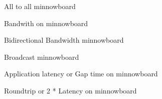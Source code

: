 \documentclass[a4paper]{article}
\begin{document}
\newpage 
    \label{sec:alltoall_minnow} 
    \begin{figure}[htp] 
        \centering{ 
            } 
        \caption{All to all minnowboard} 
    \end{figure}


\newpage 
    \label{sec:bandwith_minnow} 
    \begin{figure}[htp] 
        \centering{ 
                }
        \caption{Bandwith on minnowboard} 
    \end{figure}


\newpage 
    \label{sec:bidirectionalbandwidth_minnow} 
        \begin{figure}[htp]
        \caption{Bidirectional Bandwidth minnowboard} 
    \end{figure}


\newpage 
    \label{sec:broadcast_minnow} 
    \begin{figure}[htp] 
        \caption{Broadcast minnowboard} 
    \end{figure}


\newpage 
    \label{sec:latency_minnow} 
    \begin{figure}[htp] 
        \centering{ 
            } 
        \caption{Application latency or Gap time on minnowboard} 
    \end{figure} \newpage


\newpage 
    \label{sec:roundtrip_minnow} 
    \begin{figure}[htp] 
        \caption{Roundtrip or 2 * Latency on  minnowboard} 
    \end{figure}
\end{document}
